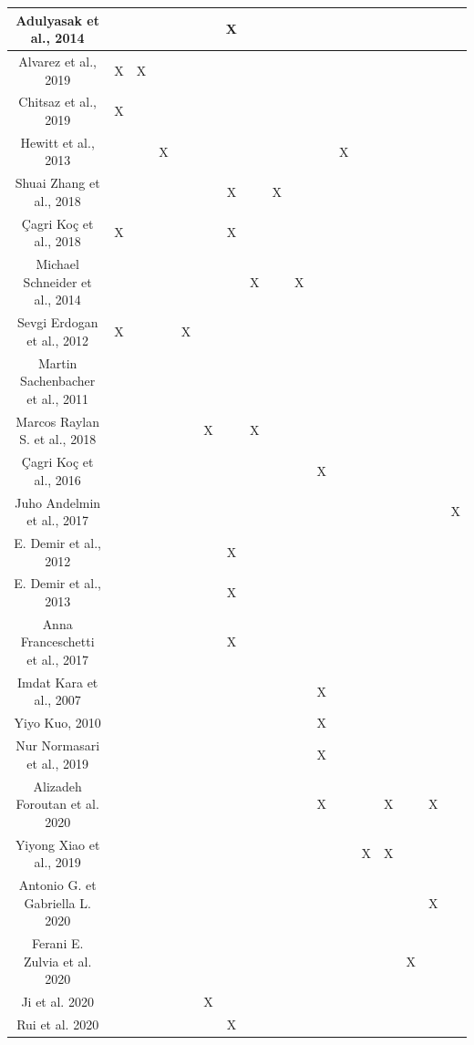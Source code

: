 \begin{center}
\begin{supertabular}{|*{17}{c|}}
		Adulyasak et al., 2014 & & & & & &X & & & & & & & & & &\\ \hline
		Alvarez et al., 2019 & X&X & & & & & & & & & & & & & &\\ \hline
		Chitsaz et al., 2019 &X & & & & & & & & & & & & & & &\\ \hline
		Hewitt et al., 2013 & & &X & & & & & & & &X & & & & &\\ \hline
		Shuai Zhang et al., 2018 & & && & & X& & X& & & & & & & &\\ \hline
		Çagri Koç et al., 2018 &X & & & & &X & & & & & & & & & &\\\hline
		Michael Schneider et al., 2014 & & & & & & &X & & X& & & & & & & \\ \hline
		Sevgi Erdogan et al., 2012 &X & & & X& & & & & & & & & & & &\\ \hline%
		Martin Sachenbacher et al., 2011 & & & & & & & & & & & & & & & &\\ \hline 
		Marcos Raylan S. et al., 2018 & & & & & X& &X & & & & & & & & &\\ \hline
		Çagri Koç et al., 2016 & & & & & & & & & &X & & & & & &\\ \hline%
		Juho Andelmin et al., 2017 & & & & & & & & & & & & & & & &X\\ \hline%
		E. Demir et al., 2012 & & & & & &X & & & & & & & & & &\\ \hline
		E. Demir et al., 2013 & & & & & &X & & & & & & & & & &\\ \hline
		Anna Franceschetti et al., 2017 & & & & & & X& & & & & & & & & &\\ \hline 
		Imdat Kara et al., 2007 & & & & & & & & & &X & & & & & &\\ \hline
		Yiyo Kuo, 2010 & & & & & & & & & &X & & & & & &\\ \hline
		Nur Normasari et al., 2019 & & & & & & & & & &X & & & & & &\\ \hline 
		Alizadeh Foroutan et al. 2020 & & & & & & & & & &X & & &X & & X & \\  \hline
		Yiyong Xiao et al., 2019 & & & & & & & & & & & &X &X & & & \\ \hline
		Antonio G. et Gabriella L. 2020 & & & & & & & & & & & & & & &X &\\ \hline
		Ferani E. Zulvia et al. 2020 & & & & & & & & & & & & & & X& &\\ \hline
		Ji et al. 2020 & & & & & X& & & & & & & & & & &\\ \hline
		Rui et al. 2020 & & & & & &X & & & & & & & & & &\\ \hline

\end{supertabular}
\end{center}
